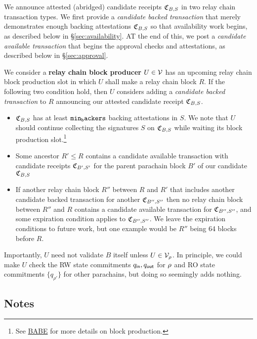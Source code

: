 We announce attested (abridged) candidate receipts $\mathfrak{C}_{B,S}$ in two relay chain transaction types.  We first provide a {\em candidate backed transaction} that merely demonstrates enough backing attestations $\mathfrak{C}_{B,S}$ so that availability work begins, as described below in \S\ref{sec:availability}.  AT the end of this, we post a {\em candidate available transaction} that begins the approval checks and attestations, as described below in \S\ref{sec:approval}.

\smallskip

We consider a {\bf relay chain block producer} $U \in \mathcal{V}$ has an upcoming relay chain block production slot in which $U$ shall make a relay chain block $R$.  If the following two condition hold, then $U$ considers adding a {\em candidate backed transaction} to $R$ announcing our attested candidate receipt $\mathfrak{C}_{B,S}$.
\begin{itemize}
%
\item $\mathfrak{C}_{B,S}$ has at least $\mathtt{min_backers}$ backing attestations in $S$.  We note that $U$ should continue collecting the signatures $S$ on $\mathfrak{C}_{B,S}$ while waiting its block production slot.\footnote{See \href{http://research.web3.foundation/en/latest/polkadot/BABE/Babe/}{BABE} for more details on block production.}
%
\item Some ancestor $R' \le R$ contains a candidate available transaction with candidate receipts $\mathfrak{C}_{B',S'}$ for the parent parachain block $B'$ of our candidate $\mathfrak{C}_{B,S}$
%
\item If another relay chain block $R''$ between $R$ and $R'$ that includes another candidate backed transaction for another $\mathfrak{C}_{B'',S''}$ then no relay chain block between $R''$ and $R$ contains a candidate available transaction for $\mathfrak{C}_{B'',S''}$, and some expiration condition applies to $\mathfrak{C}_{B'',S''}$.  
We leave the expiration conditions to future work, but one example would be $R''$ being 64 blocks before $R$.
%
\end{itemize}
Importantly, $U$ need not validate $B$ itself unless $U \in \mathcal{V}_{\rho}$.  In principle, we could make $U$ check the RW state commitments $q_{\mathsf{in}},q_{\mathsf{out}}$ for $\rho$ and RO state commitments $\{ q_{\rho'} \}$ for other parachains, but doing so seemingly adds nothing.


\subsection{Notes}

